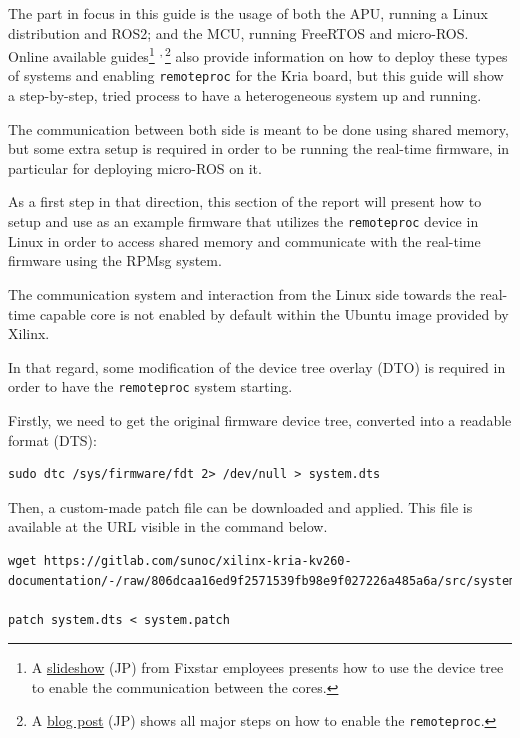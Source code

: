 \documentclass[10pt]{article}
\begin{document}
The part in focus in this guide is the usage of both the APU, running
a Linux distribution and ROS2; and the MCU, running FreeRTOS and micro-ROS.
Online available guides\footnote{A \href{https://speakerdeck.com/fixstars/fpga-seminar-12-fixstars-corporation-20220727}{slideshow} (JP) from Fixstar employees presents how to use the device
tree to enable the communication between the cores.} \textsuperscript{,}\,\footnote{A \href{https://zenn.dev/ryuz88/articles/kv260\_setup\_memo\_ubuntu22 }{blog post} (JP) shows all major steps on how to enable the \texttt{remoteproc}.} also provide information on how to deploy these types
of systems and enabling \texttt{remoteproc} for the Kria board, but this guide
will show a step-by-step, tried process to have a heterogeneous system
up and running.

The communication between both side is meant to be done using shared memory, but
some extra setup is required in order to be running the real-time firmware, in particular
for deploying micro-ROS on it.

As a first step in that direction, this section of the report
will present how to setup and use as an example firmware that utilizes the
\texttt{remoteproc} device in Linux in order to access shared memory
and communicate with the real-time firmware using the RPMsg system.

The communication system and interaction from the Linux side towards the real-time capable core
is not enabled by default within the Ubuntu image provided by Xilinx.

In that regard, some modification of the device tree overlay (DTO) is required in order to have
the \texttt{remoteproc} system starting.

Firstly, we need to get the original firmware device tree, converted
into a readable format (DTS):

\begin{verbatim}
sudo dtc /sys/firmware/fdt 2> /dev/null > system.dts
\end{verbatim}

Then, a custom-made patch file can be downloaded and applied.
This file is available at the URL visible in the command below.

\begin{verbatim}
wget https://gitlab.com/sunoc/xilinx-kria-kv260-documentation/-/raw/806dcaa16ed9f2571539fb98e9f027226a485a6a/src/system.patch

patch system.dts < system.patch
\end{verbatim}
\end{document}
